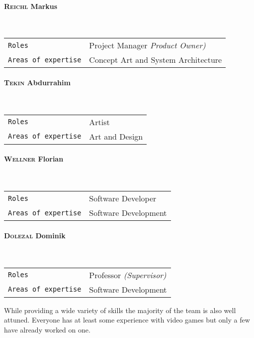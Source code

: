 \documentclass[11pt]{article}
\begin{document}
\paragraph{\textsc{Reichl} Markus} ~\\
\begin{tabular}{ll}
\texttt{Roles} & Project Manager \textit{\small{Product Owner)}}\\
\texttt{Areas of expertise} & Concept Art and System Architecture
\end{tabular}
\paragraph{\textsc{Tekin} Abdurrahim} ~\\
\begin{tabular}{ll}
\texttt{Roles} & Artist\\
\texttt{Areas of expertise} & Art and Design
\end{tabular}
\paragraph{\textsc{Wellner} Florian} ~\\
\begin{tabular}{ll}
\texttt{Roles} & Software Developer\\
\texttt{Areas of expertise} & Software Development
\end{tabular}
\paragraph{\textsc{Dolezal} Dominik} ~\\
\begin{tabular}{ll}
\texttt{Roles} & Professor \textit{\small{(Supervisor)}}\\
\texttt{Areas of expertise} & Software Development
\end{tabular}
While providing a wide variety of skills the majority of the team is also well attuned. Everyone has at least some experience with video games but only a few have already worked on one.
\end{document}
